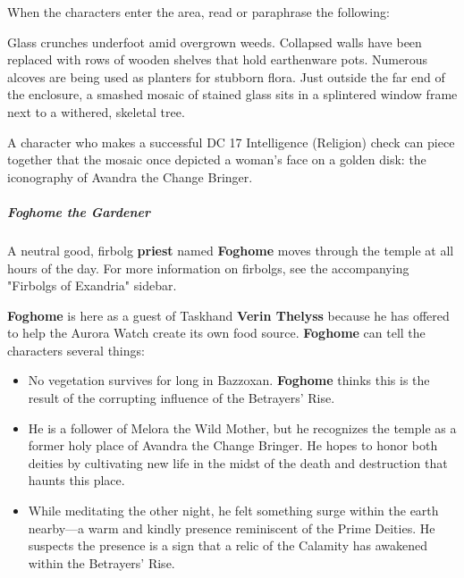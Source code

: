 \documentclass[10pt,a4paper,twoside,fancy,bg=print,twocolumn,openany,nodeprecatedcode]{dndbook}
\begin{document}
When the characters enter the area, read or paraphrase the following:

\begin{DndReadAloud}{}
Glass crunches underfoot amid overgrown weeds. Collapsed walls have been replaced with rows of wooden shelves that hold earthenware pots. Numerous alcoves are being used as planters for stubborn flora. Just outside the far end of the enclosure, a smashed mosaic of stained glass sits in a splintered window frame next to a withered, skeletal tree.

\end{DndReadAloud}

A character who makes a successful DC 17 Intelligence (Religion) check can piece together that the mosaic once depicted a woman's face on a golden disk: the iconography of Avandra the Change Bringer.

\subparagraph{Foghome the Gardener}
A neutral good, firbolg \textbf{priest} named \textbf{Foghome} moves through the temple at all hours of the day. For more information on firbolgs, see the accompanying "Firbolgs of Exandria" sidebar.

\textbf{Foghome} is here as a guest of Taskhand \textbf{Verin Thelyss} because he has offered to help the Aurora Watch create its own food source. \textbf{Foghome} can tell the characters several things:


\begin{itemize}
\item No vegetation survives for long in Bazzoxan. \textbf{Foghome} thinks this is the result of the corrupting influence of the Betrayers' Rise.
\item He is a follower of Melora the Wild Mother, but he recognizes the temple as a former holy place of Avandra the Change Bringer. He hopes to honor both deities by cultivating new life in the midst of the death and destruction that haunts this place.
\item While meditating the other night, he felt something surge within the earth nearby—a warm and kindly presence reminiscent of the Prime Deities. He suspects the presence is a sign that a relic of the Calamity has awakened within the Betrayers' Rise.
\end{itemize}
\end{document}
